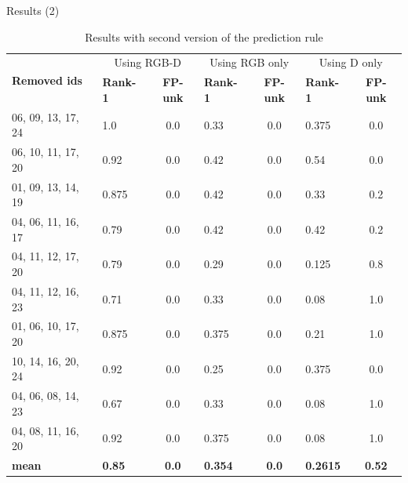\documentclass[unknownkeysallowed]{beamer}
\begin{document}
\begin{frame}{Results (2)}
	\scriptsize
	\begin{table}[]
		\centering
		\caption{Results with second version of the prediction rule}
		\begin{tabular}{|l|l|c|l|c|l|c|}
			\hline
			\multirow{2}{*}{\bf Removed ids} & \multicolumn{2}{c|}{Using RGB-D} &\multicolumn{2}{c|}{Using RGB only} &\multicolumn{2}{c|}{Using D only} \\ \cline{2-7}
							 & \bf Rank-1 & \bf FP-unk          & \bf Rank-1 & \bf FP-unk            & \bf Rank-1 & \bf FP-unk  \\ \hline

			06, 09, 13, 17, 24               & 1.0        & 0.0                 & 0.33       & 0.0                   & 0.375      & 0.0\\ \hline
			06, 10, 11, 17, 20               & 0.92       & 0.0                 & 0.42       & 0.0                   & 0.54       & 0.0\\ \hline
			01, 09, 13, 14, 19               & 0.875      & 0.0                 & 0.42       & 0.0                   & 0.33       & 0.2\\ \hline
			04, 06, 11, 16, 17               & 0.79       & 0.0                 & 0.42       & 0.0                   & 0.42       & 0.2\\ \hline
			04, 11, 12, 17, 20               & 0.79       & 0.0                 & 0.29       & 0.0                   & 0.125      & 0.8\\ \hline
			04, 11, 12, 16, 23               & 0.71       & 0.0                 & 0.33       & 0.0                   & 0.08       & 1.0\\ \hline
			01, 06, 10, 17, 20               & 0.875      & 0.0                 & 0.375      & 0.0                   & 0.21       & 1.0\\ \hline
			10, 14, 16, 20, 24               & 0.92       & 0.0                 & 0.25       & 0.0                   & 0.375      & 0.0\\ \hline
			04, 06, 08, 14, 23               & 0.67       & 0.0                 & 0.33       & 0.0                   & 0.08       & 1.0\\ \hline
			04, 08, 11, 16, 20               & 0.92       & 0.0                 & 0.375      & 0.0                   & 0.08       & 1.0\\ \hline
			\bf mean                         & \bf 0.85   & \bf 0.0             & \bf 0.354  & \bf 0.0               & \bf 0.2615 & \bf 0.52\\ \hline
		\end{tabular}
	\end{table}


\end{frame}
\end{document}
